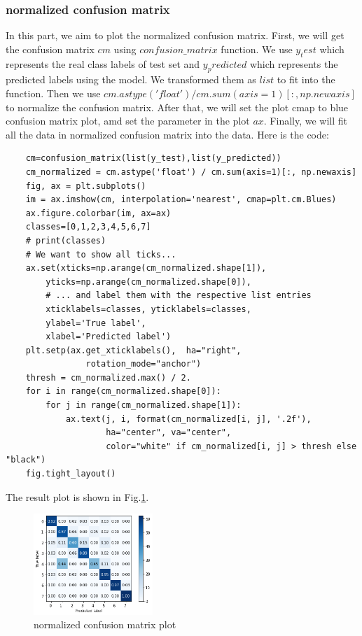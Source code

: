 \documentclass[conference]{IEEEtran}
\begin{document}
\subsubsection{normalized confusion matrix}
In this part, we aim to plot the normalized confusion matrix.
First, we will get the confusion matrix $cm$ using $confusion\_matrix$ function.
We use $y_test$ which represents the real class labels of test set and $y_predicted$ which represents the predicted labels using the model.
We transformed them as $list$ to fit into the function.
Then we use $cm.astype('float') / cm.sum(axis=1)[:, np.newaxis]$ to normalize the confusion matrix.
After that, we will set the plot cmap to blue confusion matrix plot, amd set the parameter in the plot $ax$.
Finally, we will fit all the data in normalized confusion matrix into the data.
Here is the code:
\begin{lstlisting}
    cm=confusion_matrix(list(y_test),list(y_predicted))
    cm_normalized = cm.astype('float') / cm.sum(axis=1)[:, np.newaxis]
    fig, ax = plt.subplots()
    im = ax.imshow(cm, interpolation='nearest', cmap=plt.cm.Blues)
    ax.figure.colorbar(im, ax=ax)
    classes=[0,1,2,3,4,5,6,7]
    # print(classes)
    # We want to show all ticks...
    ax.set(xticks=np.arange(cm_normalized.shape[1]),
        yticks=np.arange(cm_normalized.shape[0]),
        # ... and label them with the respective list entries
        xticklabels=classes, yticklabels=classes,
        ylabel='True label',
        xlabel='Predicted label')
    plt.setp(ax.get_xticklabels(),  ha="right",
                rotation_mode="anchor")
    thresh = cm_normalized.max() / 2.
    for i in range(cm_normalized.shape[0]):
        for j in range(cm_normalized.shape[1]):
            ax.text(j, i, format(cm_normalized[i, j], '.2f'),
                    ha="center", va="center",
                    color="white" if cm_normalized[i, j] > thresh else "black")
    fig.tight_layout()
\end{lstlisting}
The result plot is shown in Fig.\ref{Fig.t3q1c}.
\begin{figure}[h] 
    \centering
    \includegraphics[width=0.4\textwidth]{T3Q1c.png}
    \caption{normalized confusion matrix plot} 
    \label{Fig.t3q1c} 
\end{figure}
\end{document}
